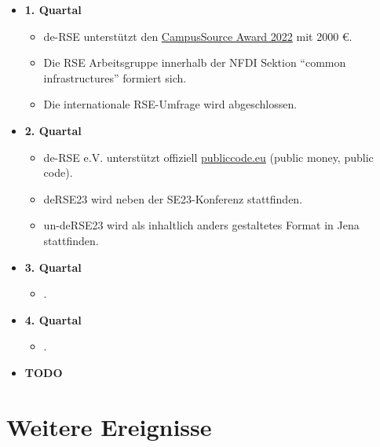 \begin{itemize}
 \item \textbf{1. Quartal}
   \begin{itemize}
     \item de-RSE unterstützt den \href{https://ev.campussource.de/publikationen/csa2022/}{CampusSource Award 2022} mit 2000 €.
     \item Die RSE Arbeitsgruppe innerhalb der NFDI Sektion "`common infrastructures"' formiert sich.
     \item Die internationale RSE-Umfrage wird abgeschlossen.
   \end{itemize}
 \item \textbf{2. Quartal}
   \begin{itemize}
    \item de-RSE e.V. unterstützt offiziell \href{https://publiccode.eu}{publiccode.eu} (public money, public code).
    \item deRSE23 wird neben der SE23-Konferenz stattfinden.
    \item un-deRSE23 wird als inhaltlich anders gestaltetes Format in Jena stattfinden.
   \end{itemize}
 \item \textbf{3. Quartal}
   \begin{itemize}
    \item .
   \end{itemize}
 \item \textbf{4. Quartal}
   \begin{itemize}
    \item .
   \end{itemize}
 \item \textbf{TODO}
\end{itemize}

\section{Weitere Ereignisse}

